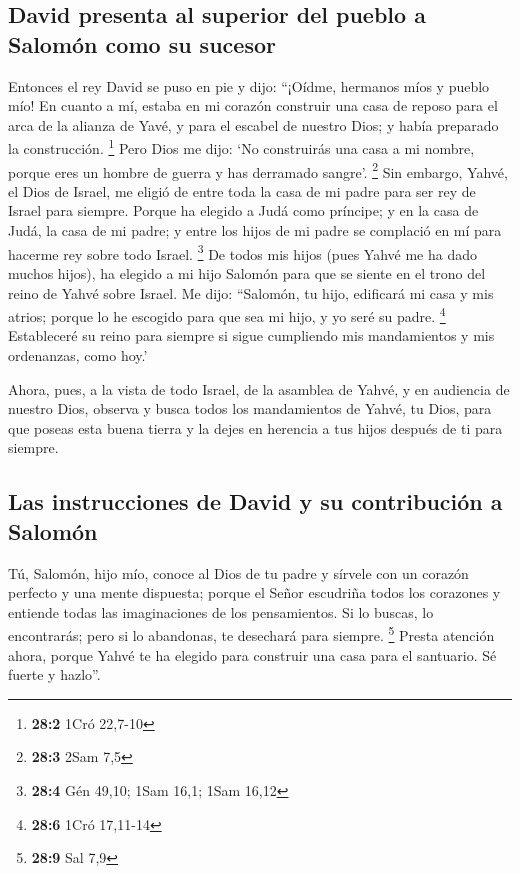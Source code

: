 \begin{paracol}{2}
\hypertarget{david-presenta-al-superior-del-pueblo-a-salomuxf3n-como-su-sucesor}{%
\subsection{David presenta al superior del pueblo a Salomón como su
sucesor}\label{david-presenta-al-superior-del-pueblo-a-salomuxf3n-como-su-sucesor}}

 Entonces el rey David se puso en pie y dijo: ``¡Oídme,
hermanos míos y pueblo mío! En cuanto a mí, estaba en mi corazón
construir una casa de reposo para el arca de la alianza de Yavé, y para
el escabel de nuestro Dios; y había preparado la construcción.
\footnote{\textbf{28:2} 1Cró 22,7-10}  Pero Dios me dijo:
`No construirás una casa a mi nombre, porque eres un hombre de guerra y
has derramado sangre'. \footnote{\textbf{28:3} 2Sam 7,5} 
Sin embargo, Yahvé, el Dios de Israel, me eligió de entre toda la casa
de mi padre para ser rey de Israel para siempre. Porque ha elegido a
Judá como príncipe; y en la casa de Judá, la casa de mi padre; y entre
los hijos de mi padre se complació en mí para hacerme rey sobre todo
Israel. \footnote{\textbf{28:4} Gén 49,10; 1Sam 16,1; 1Sam 16,12}
 De todos mis hijos (pues Yahvé me ha dado muchos hijos),
ha elegido a mi hijo Salomón para que se siente en el trono del reino de
Yahvé sobre Israel.  Me dijo: ``Salomón, tu hijo,
edificará mi casa y mis atrios; porque lo he escogido para que sea mi
hijo, y yo seré su padre. \footnote{\textbf{28:6} 1Cró 17,11-14}
 Estableceré su reino para siempre si sigue cumpliendo mis
mandamientos y mis ordenanzas, como hoy.'

 Ahora, pues, a la vista de todo Israel, de la asamblea de
Yahvé, y en audiencia de nuestro Dios, observa y busca todos los
mandamientos de Yahvé, tu Dios, para que poseas esta buena tierra y la
dejes en herencia a tus hijos después de ti para siempre.

\hypertarget{las-instrucciones-de-david-y-su-contribuciuxf3n-a-salomuxf3n}{%
\subsection{Las instrucciones de David y su contribución a
Salomón}\label{las-instrucciones-de-david-y-su-contribuciuxf3n-a-salomuxf3n}}

 Tú, Salomón, hijo mío, conoce al Dios de tu padre y
sírvele con un corazón perfecto y una mente dispuesta; porque el Señor
escudriña todos los corazones y entiende todas las imaginaciones de los
pensamientos. Si lo buscas, lo encontrarás; pero si lo abandonas, te
desechará para siempre. \footnote{\textbf{28:9} Sal 7,9} 
Presta atención ahora, porque Yahvé te ha elegido para construir una
casa para el santuario. Sé fuerte y hazlo''.


\end{paracol}
